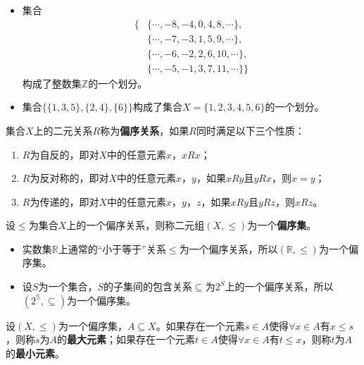 \documentclass{beamer}
\begin{document}
\begin{CJK*}{UTF8}{gbsn}
\begin{frame}
  \begin{Ex}
    \begin{itemize}
    \item     集合
    \begin{equation*}
      \begin{split}
      \{&\{\cdots,-8,-4,0,4,8,\cdots\},\\
      &\{\cdots,-7,-3,1,5,9,\cdots\},\\
      &\{\cdots,-6,-2,2,6,10,\cdots\},\\
      &\{\cdots,-5,-1,3,7,11,\cdots\}\}
    \end{split}
  \end{equation*}
  构成了整数集$\mathbb{Z}$的一个划分。
\item     集合$\{\{1,3,5\},\{2,4\},\{6\}\}$构成了集合$X=\{1,2,3,4,5,6\}$的一个划分。
\end{itemize}
\end{Ex}
\end{frame}
\begin{frame}
    \begin{Def}
    集合$X$上的二元关系$R$称为{\bfseries 偏序关系}，如果$R$同时满足以下三个性质：
    \begin{enumerate}
    \item $R$为自反的，即对$X$中的任意元素$x$，$xRx$；
    \item $R$为反对称的，即对$X$中的任意元素$x$，$y$，如果$xRy$且$yRx$，则$x=y$；
    \item $R$为传递的，即对$X$中的任意元素$x$，$y$，$z$，如果$xRy$且$yRz$，则$xRz$。
    \end{enumerate}
  \end{Def}
    \begin{Def}
    设$\leq$为集合$X$上的一个偏序关系，则称二元组$(X,\leq)$为一个{\bfseries 偏序集}。
  \end{Def}

  \begin{Ex}
    \begin{itemize}
    \item  实数集$\mathbb{R}$上通常的“小于等于”关系$\leq$为一个偏序关系，所以$(\mathbb{R},\leq)$为一个偏序集。
    \item  设$S$为一个集合，$S$的子集间的包含关系$\subseteq$为$2^S$上的一个偏序关系，所以$(2^{\mathbb{S}},\subseteq)$为一个偏序集。
    \end{itemize}
  \end{Ex}
\end{frame}

\begin{frame}
    \begin{Def}
    设$(X,\leq)$为一个偏序集，$A\subseteq X$。如果存在一个元素$s\in A$使得$\forall x \in A$有$x \leq s$，则称$s$为$A$的{\bfseries 最大元素}；如果存在一个元素$t\in A$使得$\forall x \in A$有$t \leq x$，则称$t$为$A$的{\bfseries 最小元素}。
  \end{Def}
\end{frame}


\end{CJK*}
\end{document}
